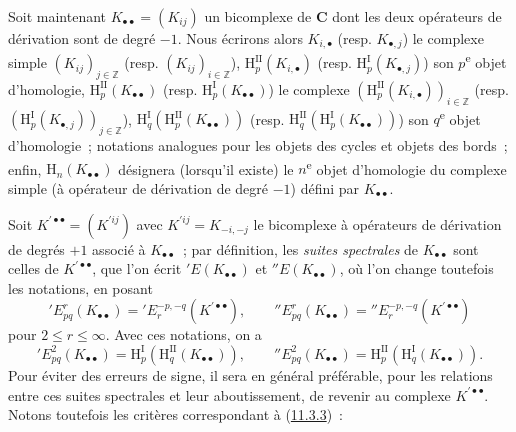\begin{env}[11.3.5]
\label{0.11.3.5-fr}
Soit maintenant $K_{\bullet\bullet}=(K_{ij})$ un bicomplexe de
$\boldsymbol{C}$ dont les deux opérateurs de dérivation sont de degré $-1$. Nous
écrirons alors $K_{i,\bullet}$ (resp. $K_{\bullet,j}$) le complexe simple
$(K_{ij})_{j\in\mathbb Z}$ (resp. $(K_{ij})_{i\in\mathbb Z}$),
$\mathrm H_p^{\mathrm{II}}(K_{i,\bullet})$ (resp.
$\mathrm H_p^{\mathrm I}(K_{\bullet,j})$) son $p$\textsuperscript{e} objet d'homologie,
$\mathrm H_p^{\mathrm{II}}(K_{\bullet\bullet})$ (resp.
$\mathrm H_p^{\mathrm I}(K_{\bullet\bullet})$) le complexe
$(\mathrm H_p^{\mathrm{II}}(K_{i,\bullet}))_{i\in\mathbb Z}$ (resp.
$(\mathrm H_p^{\mathrm I}(K_{\bullet,j}))_{j\in\mathbb Z}$),
$\mathrm H_q^{\mathrm I}(\mathrm H_p^{\mathrm{II}}(K_{\bullet\bullet}))$
(resp.
$\mathrm H_q^{\mathrm{II}}(\mathrm H_p^{\mathrm I}(K_{\bullet\bullet}))$)
son $q$\textsuperscript{e} objet d'homologie~; notations analogues pour les objets des cycles
et objets des bords~; enfin, $\mathrm H_n(K_{\bullet\bullet})$ désignera
(lorsqu'il existe) le $n$\textsuperscript{e} objet d'homologie du complexe simple (à
opérateur de dérivation de degré $-1$) défini par $K_{\bullet\bullet}$.

Soit $K^{\prime\bullet\bullet}=(K^{\prime ij})$ avec
$K^{\prime ij}=K_{-i,-j}$ le bicomplexe à opérateurs de dérivation de degrés
$+1$ associé à $K_{\bullet\bullet}$~; par définition, les
\emph{suites spectrales} de $K_{\bullet\bullet}$ sont celles de
$K^{\prime\bullet\bullet}$, que l'on écrit $'E(K_{\bullet\bullet})$ et
$''E(K_{\bullet\bullet})$, où l'on change toutefois les notations, en posant
\[
  'E_{pq}^r(K_{\bullet\bullet})
  ='E_r^{-p,-q}(K^{\prime\bullet\bullet}),\qquad
  ''E_{pq}^r(K_{\bullet\bullet})
  =''E_r^{-p,-q}(K^{\prime\bullet\bullet})
\]
pour $2\leq r\leq\infty$. Avec ces notations, on a
\[
  'E_{pq}^2(K_{\bullet\bullet})
  =\mathrm H_p^{\mathrm I}(\mathrm H_q^{\mathrm{II}}(K_{\bullet\bullet})),
  \qquad
  ''E_{pq}^2(K_{\bullet\bullet})
  =\mathrm H_p^{\mathrm{II}}(\mathrm H_q^{\mathrm I}(K_{\bullet\bullet})).
\]
Pour éviter des erreurs de signe, il sera en général préférable, pour les
relations entre ces suites spectrales et leur aboutissement, de revenir au
complexe $K^{\prime\bullet\bullet}$. Notons toutefois les critères
correspondant à (\hyperref[0.11.3.3-fr]{11.3.3})~:
\end{env}

